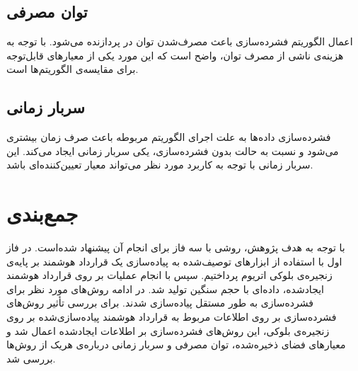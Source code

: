 \subsection{توان مصرفی}
اعمال الگوریتم فشرده‌سازی باعث مصرف‌شدن توان در پردازنده می‌شود. با توجه به هزینه‌ی ناشی از مصرف توان،‌ واضح است که این مورد یکی از معیارهای قابل‌توجه برای مقایسه‌ی الگوریتم‌ها است. 

\subsection{سربار زمانی}
فشرده‌سازی داده‌ها به علت اجرای الگوریتم مربوطه باعث صرف زمان بیشتری می‌شود و نسبت به حالت بدون فشرده‌سازی، یکی سربار زمانی ایجاد می‌کند. این سربار زمانی با توجه به کاربرد مورد نظر می‌تواند معیار تعیین‌کننده‌ای باشد.

\section{‌جمع‌بندی}
با توجه به هدف پژوهش، روشی با سه فاز برای انجام آن پیشنهاد شده‌است. در فاز اول با استفاده از ابزارهای توصیف‌شده به پیاده‌سازی یک قرارداد هوشمند بر پایه‌ی زنجیره‌ی بلوکی اتریوم پرداختیم. سپس با انجام عملیات بر روی قرارداد هوشمند ایجادشده، داده‌ای با حجم سنگین تولید شد. در ادامه روش‌های مورد نظر برای فشرده‌سازی به طور مستقل پیاده‌سازی شدند. برای بررسی تأثیر روش‌‌های فشرده‌سازی بر روی اطلاعات مربوط به قرارداد هوشمند پیاده‌سازی‌شده بر روی زنجیره‌ی بلوکی، این روش‌های فشرده‌سازی بر اطلاعات ایجاد‌شده اعمال شد و معیارهای فضای ذخیره‌شده، توان مصرفی و سربار زمانی درباره‌ی هریک از روش‌ها بررسی شد.
